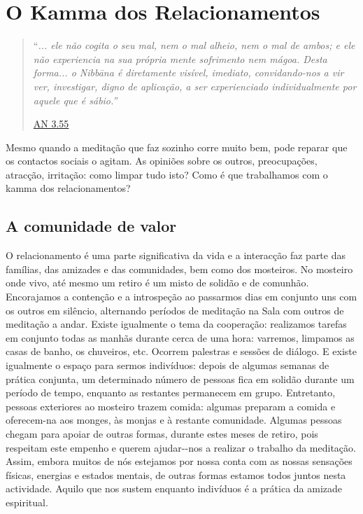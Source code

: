 \chapter{O Kamma dos Relacionamentos}

\begin{quote}

``\emph{... ele não cogita o seu mal, nem o mal alheio, nem o mal de ambos; e ele não experiencia na sua própria mente sofrimento nem mágoa. Desta forma... o Nibbāna é diretamente visível, imediato, convidando-nos a vir ver, investigar, digno de aplicação, a ser experienciado individualmente por aquele que é sábio.''}

\href{https://suttacentral.net/an3.55/en/bodhi}{AN 3.55}
\end{quote}

Mesmo quando a meditação que faz sozinho corre muito bem, pode reparar que os contactos sociais o agitam. As opiniões sobre os outros, preocupações, atracção, irritação: como limpar tudo isto? Como é que trabalhamos com o kamma dos relacionamentos?

\section{A comunidade de valor}

O relacionamento é uma parte significativa da vida e a interacção faz parte das famílias, das amizades e das comunidades, bem como dos mosteiros. No mosteiro onde vivo, até mesmo um retiro é um misto de solidão e de comunhão. Encorajamos a contenção e a introspeção ao passarmos dias em conjunto uns com os outros em silêncio, alternando períodos de meditação na Sala com outros de meditação a andar. Existe igualmente o tema da cooperação: realizamos tarefas em conjunto todas as manhãs durante cerca de uma hora: varremos, limpamos as casas de banho, os chuveiros, etc. Ocorrem palestras e sessões de diálogo. E existe igualmente o espaço para sermos indivíduos: depois de algumas semanas de prática conjunta, um determinado número de pessoas fica em solidão durante um período de tempo, enquanto as restantes permanecem em grupo. Entretanto, pessoas exteriores ao mosteiro trazem comida: algumas preparam a comida e oferecem-na aos monges, às monjas e à restante comunidade. Algumas pessoas chegam para apoiar de outras formas, durante estes meses de retiro, pois respeitam este empenho e querem ajudar-\/-nos a realizar o trabalho da meditação. Assim, embora muitos de nós estejamos por nossa conta com as nossas sensações físicas, energias e estados mentais, de outras formas estamos todos juntos nesta actividade. Aquilo que nos sustem enquanto indivíduos é a prática da amizade espiritual.

